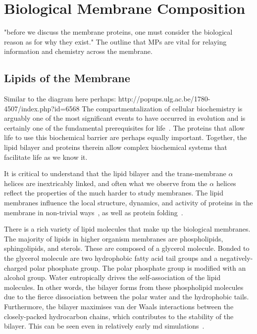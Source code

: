\section{Biological Membrane Composition}

"before we discuss the membrane proteins, one must consider the biological reason as for why they exist."
The outline that MPs are vital for relaying information and chemistry across the membrane.
\subsection{Lipids of the Membrane}

Similar to the diagram here perhaps: http://popups.ulg.ac.be/1780-4507/index.php?id=6568
The compartmentalization of cellular biochemistry is arguably one of the most significant events to have occurred in evolution and is certainly one of the fundamental prerequisites for life~\cite{Koshland2002}.
 The proteins that allow life to use this biochemical barrier are perhaps equally important.
Together, the lipid bilayer and proteins therein allow complex biochemical systems that facilitate life as we know it.

It is critical to understand that the lipid bilayer and the trans-membrane $\alpha$ helices are inextricably linked, and often what we observe from the $\alpha$ helices reflect the properties of the much harder to study membranes.
The lipid membranes influence the local structure, dynamics, and activity of proteins in the membrane in non-trivial ways~\cite{Bondar2010, Bondar2009, Jardon-Valadez2010, Kalvodova2005, Urban2005, White2001a, Jensen2004, Henin2014}, as well as protein folding~\cite{Kauko2010}.

There is a rich variety of lipid molecules that make up the biological membranes.
The majority of lipids in higher organism membranes are phospholipids, sphingolipids, and sterols.
These are composed of a glycerol molecule.
Bonded to the glycerol molecule are two hydrophobic fatty acid tail groups and a negatively-charged polar phosphate group.
The polar phosphate group is modified with an alcohol group.
Water entropically drives the self-association of the lipid molecules.
In other words, the bilayer forms from these phospholipid molecules due to the fierce dissociation between the polar water and the hydrophobic tails.
Furthermore, the bilayer maximises van der Waals interactions between the closely-packed hydrocarbon chains, which contributes to the stability of the bilayer.
This can be seen even in relatively early \gls{md} simulations~\cite{Goetz1998}.

